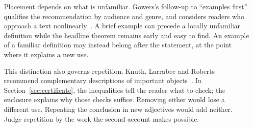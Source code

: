 Placement depends on what is unfamiliar. Gowers's follow-up to ``examples
first'' qualifies the recommendation by audience and genre, and considers
readers who approach a text nonlinearly~\cite{gowers-followup}. A brief example
can precede a locally unfamiliar definition while the headline theorem remains
early and easy to find. An example of a familiar definition may instead belong
after the statement, at the point where it explains a new use.

This distinction also governs repetition. Knuth, Larrabee and Roberts recommend
complementary descriptions of important objects~\cite[\S1, item~11]{knuth}.
In Section~\ref{sec:certificate}, the inequalities tell the reader what to
check; the enclosure explains why those checks suffice. Removing either
would lose a different use. Repeating the conclusion in new adjectives would
add neither. Judge repetition by the work the second account makes possible.
